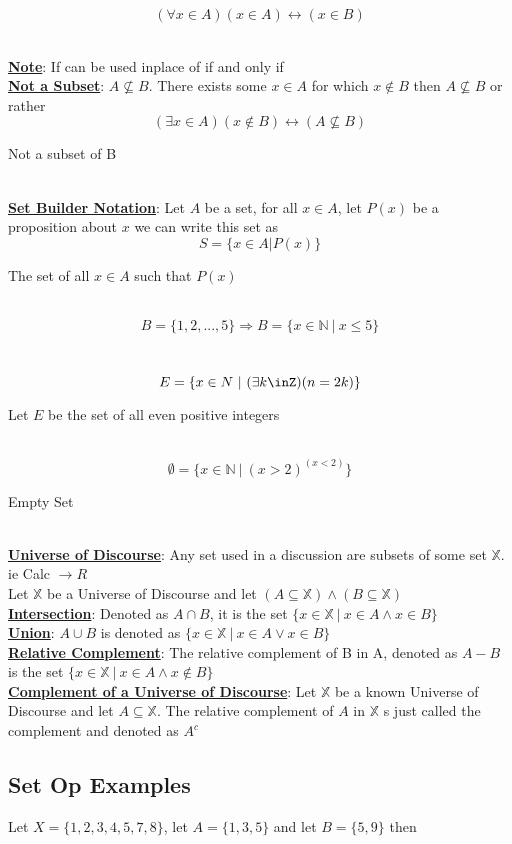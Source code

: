 \documentclass[12pt]{article}
\newcommand{\defline}[2]{\noindent\textbf{\underline{#1}}: #2\\}
\newcommand{\example}[2]{
    \begin{equation}
        #1
    \end{equation}\caption{#2}\\
}
\begin{document}
            \example{(\forall x \in A)(x\in A)\leftrightarrow(x\in B)}{}

            \defline{Note}{If can be used inplace of if and only if}

            \defline{Not a Subset}{$A\not\subseteq B$. There exists some $x\in A$ for which $x\notin B$ then $A\not\subseteq B$ or rather}
            \example{(\exists x\in A)(x\notin B)\leftrightarrow(A\not\subseteq B)}{Not a subset of B}

            \defline{Set Builder Notation}{Let $A$ be a set, for all $x\in A$, let $P(x)$ be a proposition about $x$ we can write this set as}
            \example{S = \{x\in A | P(x)\}}{The set of all $x\in A$ such that $P(x)$}

            \example{B = \{1, 2,...,5\} \Rightarrow B = \{x\in \mathbb{N}\ |\ x\leq 5\}}{}

            \example{E =\{x\in N\ |\ (\exists k\inZ)(n=2k)\}}{Let $E$ be the set of all even positive integers}

            \example{\emptyset = \{x\in\mathbb{N}\ |\ (x > 2)^(x < 2)\}}{Empty Set}

            \defline{Universe of Discourse}{Any set used in a discussion are subsets of some set $\mathbb{X}$. ie Calc $\rightarrow R$}

            Let $\mathbb{X}$ be a Universe of Discourse and let $(A\subseteq \mathbb{X}) \wedge (B\subseteq \mathbb{X})$\\

            \defline{Intersection}{Denoted as $A\cap B$, it is the set $\{x\in \mathbb{X}\ |\ x\in A \wedge x\in B\}$}

            \defline{Union}{$A \cup B$ is denoted as $\{x\in \mathbb{X}\ |\ x\in A \vee x\in B\}$}

            \defline{Relative Complement}{The relative complement of B in A, denoted as $A - B$ is the set $\{x\in \mathbb{X}\ |\ x\in A \wedge x\notin B\}$}

            \defline{Complement of a Universe of Discourse}
            {Let $\mathbb{X}$ be a known Universe of Discourse and let $A\subseteq \mathbb{X}$. The relative complement of $A$ in $\mathbb{X}$ s just called the complement and denoted as $A^c$}

            \subsection{Set Op Examples}
                Let $X = \{1, 2, 3, 4, 5, 7, 8\}$, let $A = \{1, 3, 5\}$ and let $B = \{5, 9\}$ then\\
\end{document}
